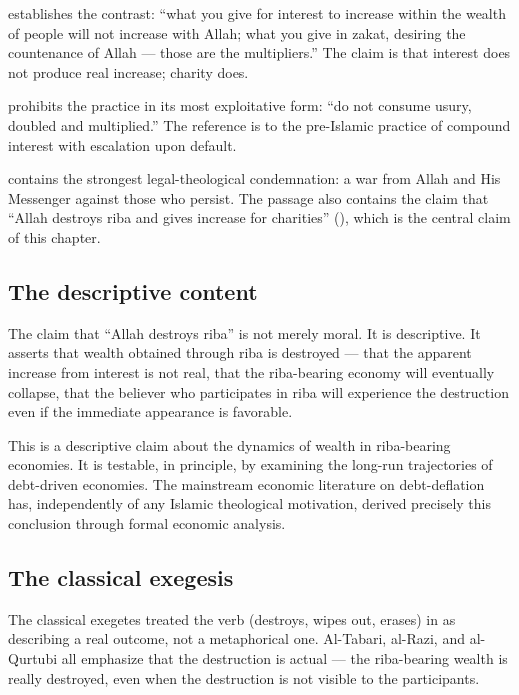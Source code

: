  establishes the contrast: ``what you give for
interest to increase within the wealth of people will not increase
with Allah; what you give in zakat, desiring the countenance of
Allah --- those are the multipliers.'' The claim is that interest
does not produce real increase; charity does.

 prohibits the practice in its most exploitative form:
``do not consume usury, doubled and multiplied.'' The reference is
to the pre-Islamic practice of compound interest with escalation
upon default.

 contains the strongest legal-theological
condemnation: a war from Allah and His Messenger against those who
persist. The passage also contains the claim that ``Allah destroys
riba and gives increase for charities'' (), which is
the central claim of this chapter.

\subsection{The descriptive content}

The claim that ``Allah destroys riba'' is not merely moral. It is
descriptive. It asserts that wealth obtained through riba is
destroyed --- that the apparent increase from interest is not
real, that the riba-bearing economy will eventually collapse, that
the believer who participates in riba will experience the
destruction even if the immediate appearance is favorable.

This is a descriptive claim about the dynamics of wealth in
riba-bearing economies. It is testable, in principle, by examining
the long-run trajectories of debt-driven economies. The mainstream
economic literature on debt-deflation has, independently of any
Islamic theological motivation, derived precisely this conclusion
through formal economic analysis.

\subsection{The classical exegesis}

The classical exegetes treated the verb  (destroys,
wipes out, erases) in  as describing a real outcome,
not a metaphorical one. Al-Tabari, al-Razi, and al-Qurtubi all
emphasize that the destruction is actual --- the riba-bearing
wealth is really destroyed, even when the destruction is not
visible to the participants.

